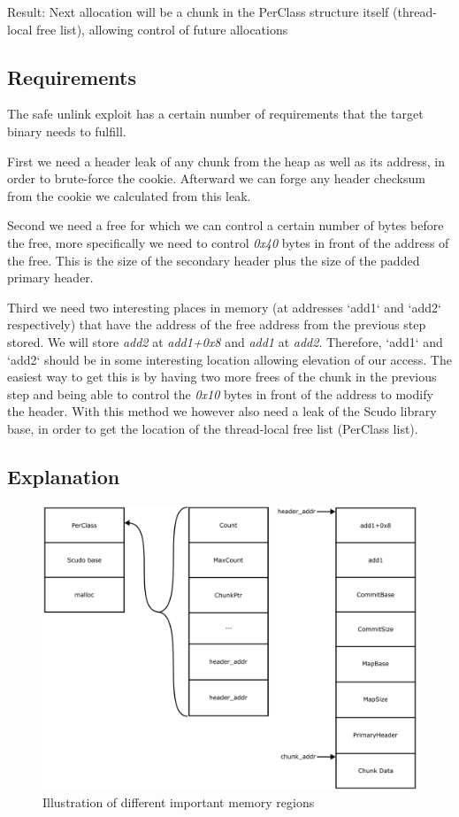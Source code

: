 \documentclass[a4paper,11pt,oneside]{report}
\begin{document}
Result: Next allocation will be a chunk in the PerClass structure itself (thread-local
free list), allowing control of future allocations


\subsection{Requirements}

The safe unlink exploit has a certain number of requirements that the target binary needs
to fulfill.

First we need a header leak of any chunk from the heap as well as its address, in
order to brute-force the cookie. Afterward we can forge any header checksum from the
cookie we calculated from this leak.

Second we need a free for which we can control a certain number of bytes before the free,
more specifically we need to control \emph{0x40} bytes in front of the address of the
free. This is the size of the secondary header plus the size of the padded primary header.

Third we need two interesting places in memory (at addresses `add1` and `add2`
respectively) that have the address of the free address from the previous step stored. We
will store \emph{add2} at \emph{add1+0x8} and \emph{add1} at \emph{add2}. Therefore, `add1`
and `add2` should be in some interesting location allowing elevation of our access.  The
easiest way to get this is by having two more frees of the chunk in the previous step and
being able to control the \emph{0x10} bytes in front of the address to modify the
header. With this method we however also need a leak of the Scudo library base, in order to
get the location of the thread-local free list (PerClass list).

\subsection{Explanation}

\begin{figure}[h!]
  \centering
  \includegraphics[width=\linewidth]{figures/SafeUnlinkMemory.png}
  \caption{Illustration of different important memory regions}
  \label{fig:SafeUnlinkMemory}
\end{figure}
\end{document}
